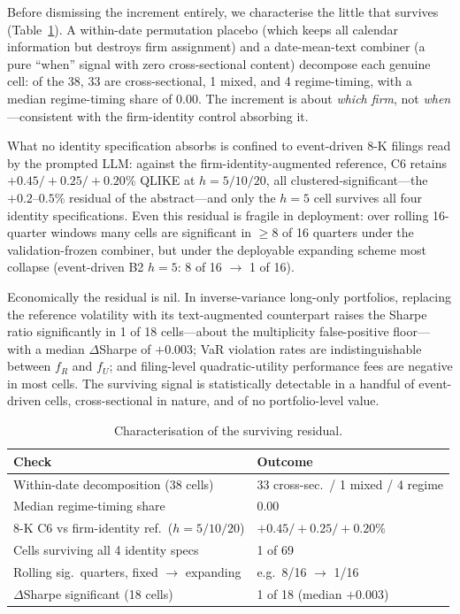 Before dismissing the increment entirely, we characterise the little that survives (Table~\ref{tab:residual}). A within-date permutation placebo (which keeps all calendar information but destroys firm assignment) and a date-mean-text combiner (a pure ``when'' signal with zero cross-sectional content) decompose each genuine cell: of the 38, 33 are cross-sectional, 1 mixed, and 4 regime-timing, with a median regime-timing share of 0.00. The increment is about \emph{which firm}, not \emph{when}---consistent with the firm-identity control absorbing it.

What no identity specification absorbs is confined to event-driven 8-K filings read by the prompted LLM: against the firm-identity-augmented reference, C6 retains $+0.45/+0.25/+0.20\%$ QLIKE at $h{=}5/10/20$, all clustered-significant---the $+0.2$--$0.5\%$ residual of the abstract---and only the $h{=}5$ cell survives all four identity specifications. Even this residual is fragile in deployment: over rolling 16-quarter windows many cells are significant in $\ge$8 of 16 quarters under the validation-frozen combiner, but under the deployable expanding scheme most collapse (event-driven B2 $h{=}5$: 8 of 16 $\to$ 1 of 16).

Economically the residual is nil. In inverse-variance long-only portfolios, replacing the reference volatility with its text-augmented counterpart raises the Sharpe ratio significantly in 1 of 18 cells---about the multiplicity false-positive floor---with a median $\Delta$Sharpe of $+0.003$; VaR violation rates are indistinguishable between $f_R$ and $f_U$; and filing-level quadratic-utility performance fees are negative in most cells. The surviving signal is statistically detectable in a handful of event-driven cells, cross-sectional in nature, and of no portfolio-level value.

\begin{table}[t]
\centering
\caption{Characterisation of the surviving residual.}
\label{tab:residual}
\footnotesize
\setlength{\tabcolsep}{4pt}
\begin{tabular}{@{}ll@{}}
\toprule
Check & Outcome \\
\midrule
Within-date decomposition (38 cells) & 33 cross-sec.\ / 1 mixed / 4 regime \\
Median regime-timing share & 0.00 \\
8-K C6 vs firm-identity ref.\ ($h{=}5/10/20$) & $+0.45/+0.25/+0.20\%$ \\
Cells surviving all 4 identity specs & 1 of 69 \\
Rolling sig.\ quarters, fixed $\to$ expanding & e.g.\ 8/16 $\to$ 1/16 \\
$\Delta$Sharpe significant (18 cells) & 1 of 18 (median $+0.003$) \\
\bottomrule
\end{tabular}
\end{table}

